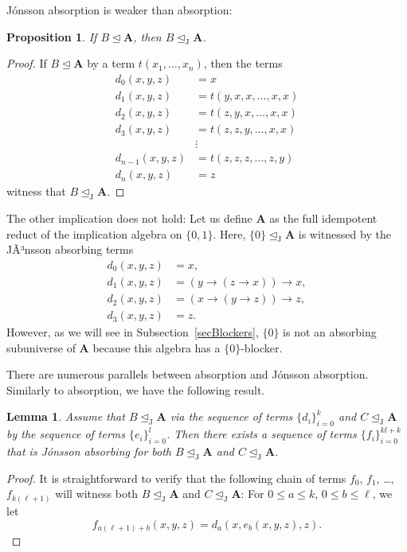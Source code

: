 \documentclass{amsart}
\theoremstyle{plain}
\newtheorem{lemma}[theorem]{Lemma}
\newtheorem{proposition}[theorem]{Proposition}
\theoremstyle{definition}
\begin{document}
J\'onsson absorption is
weaker than absorption:

\begin{proposition} \label{abs-jabs}
If $B \operatorname{\trianglelefteq} {{\mathbf{A}}}$, then $B \operatorname{\trianglelefteq_J} {{\mathbf{A}}}$.
\end{proposition}
\begin{proof}
If $B\operatorname{\trianglelefteq} {{\mathbf{A}}}$ by a term
$t(x_1,\dots,x_n)$, then the terms
\begin{align*}
  d_0(x,y,z)&=x\\
  d_1(x,y,z)&=t(y,x,x,\dots,x,x)\\
  d_2(x,y,z)&=t(z,y,x,\dots,x,x)\\
  d_3(x,y,z)&=t(z,z,y,\dots,x,x)\\
	    &\vdots\\
  d_{n-1}(x,y,z)&=t(z,z,z,\dots,z,y)\\
  d_n(x,y,z)&=z
\end{align*}
witness that  $B\operatorname{\trianglelefteq_J} {{\mathbf{A}}}$.
\end{proof}

  The other implication does not hold: Let us define ${{\mathbf{A}}}$ as the full idempotent reduct of
  the implication algebra on $\{0,1\}$. Here, $\{0\}\operatorname{\trianglelefteq_J} {{\mathbf{A}}}$ is
  witnessed by the JÃ³nsson absorbing terms
  \begin{align*}
    d_0(x,y,z)&=x,\\
    d_1(x,y,z)&=(y\to(z\to x))\to x,\\
    d_2(x,y,z)&=(x\to(y\to z))\to z,\\
    d_3(x,y,z)&=z.
  \end{align*}
  However, as we will see in Subsection~\ref{secBlockers},
  $\{0\}$ is not an absorbing subuniverse of ${{\mathbf{A}}}$ because this algebra has a
  $\{0\}$-blocker.

  There are numerous parallels between absorption and J\'onsson absorption.
Similarly to absorption, we have the following result.

\begin{lemma} \label{common-jabs}
  Assume that $B\operatorname{\trianglelefteq_J} {{\mathbf{A}}}$ via the sequence of terms $\{d_i\}_{i=0}^k$ and 
  $C\operatorname{\trianglelefteq_J} {{\mathbf{A}}}$ by the sequence of terms $\{e_i\}_{i=0}^l$. Then there
  exists a sequence of terms $\{f_i\}_{i=0}^{kl+k}$ that is J\'onsson absorbing for
  both $B\operatorname{\trianglelefteq_J} {{\mathbf{A}}}$ and $C\operatorname{\trianglelefteq_J} {{\mathbf{A}}}$.
\end{lemma}
\begin{proof}
  It is straightforward to verify that the following chain of terms
  $f_0$, $f_1$, \dots, $f_{k(\ell+1)}$ will witness both $B\operatorname{\trianglelefteq_J} {{\mathbf{A}}}$ and $C\operatorname{\trianglelefteq_J} {{\mathbf{A}}}$:
  For $0\leq a\leq k$, $0\leq b \leq \ell$, we let
\[
  f_{a(\ell+1)+b}(x,y,z)=d_a(x,e_b(x,y,z),z).
\]
\end{proof}
\end{document}
